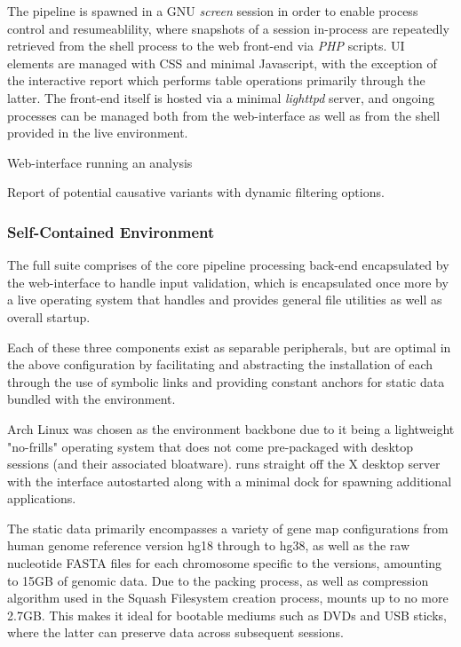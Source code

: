The pipeline is spawned in a GNU \textit{screen} session in order to enable process control and resumeablility, where snapshots of a session in-process are repeatedly retrieved from the shell process to the web front-end via \textit{PHP} scripts. UI elements are managed with CSS and minimal Javascript, with the exception of the interactive report which performs table operations primarily through the latter. The front-end itself is hosted via a minimal \textit{lighttpd} server, and ongoing \app processes can be managed both from the web-interface as well as from the shell provided in the live environment.


{Web-interface running an analysis}

{Report of potential causative variants with dynamic filtering options.}



\subsubsection{Self-Contained Environment}

The full \app suite comprises of the core pipeline processing back-end encapsulated by the web-interface to handle input validation, which is encapsulated once more by a live operating system that handles and provides general file utilities as well as overall startup.

Each of these three components exist as separable peripherals, but are optimal in the above configuration by facilitating and abstracting the installation of each through the use of symbolic links and providing constant anchors for static data bundled with the environment.

Arch Linux was chosen as the environment backbone due to it being a lightweight "no-frills" operating system that does not come pre-packaged with desktop sessions (and their associated bloatware). \app runs straight off the X desktop server with the \app interface autostarted along with a minimal dock for spawning additional applications.

The static data primarily encompasses a variety of gene map configurations from human genome reference version hg18 through to hg38, as well as the raw nucleotide FASTA files for each chromosome specific to the versions, amounting to 15GB of genomic data. Due to the packing process, as well as compression algorithm used in the Squash Filesystem creation process, \app mounts up to no more 2.7GB. This makes it ideal for bootable mediums such as DVDs and USB sticks, where the latter can preserve data across subsequent sessions.

